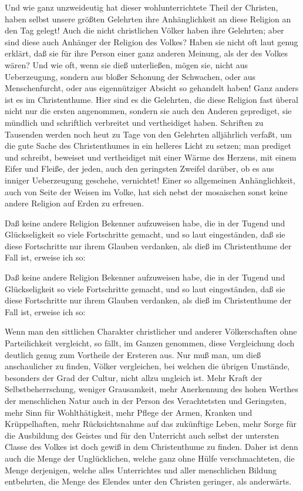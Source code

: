 \begin{aufza}
\begin{aufzb}
\item Und wie ganz unzweideutig hat dieser wohlunterrichtete Theil der Christen, haben selbst unsere größten Gelehrten ihre Anhänglichkeit an diese Religion an den Tag gelegt! Auch die nicht christlichen Völker haben ihre Gelehrten; aber sind diese auch Anhänger der Religion des Volkes? Haben sie nicht oft laut genug erklärt, daß sie für ihre Person einer ganz anderen Meinung, als der des Volkes wären? Und wie oft, wenn sie dieß unterließen, mögen sie, nicht aus Ueberzeugung, sondern aus bloßer Schonung der Schwachen, oder aus Menschenfurcht, oder aus eigennütziger Absicht so gehandelt haben! Ganz anders ist es im Christenthume. Hier sind es die Gelehrten, die diese Religion fast überal nicht nur die ersten angenommen, sondern sie auch den Anderen geprediget, sie mündlich und schriftlich verbreitet und vertheidiget haben. Schriften zu Tausenden werden noch heut zu Tage von den Gelehrten alljährlich verfaßt, um die gute Sache des Christenthumes in ein helleres Licht zu setzen; man prediget und schreibt, beweiset und vertheidiget mit einer Wärme des Herzens, mit einem Eifer und Fleiße, der jeden, auch den geringsten Zweifel darüber, ob es aus inniger Ueberzeugung geschehe, vernichtet! Einer so allgemeinen Anhänglichkeit, auch von Seite der Weisen im Volke, hat sich nebst der mosaischen sonst keine andere Religion auf Erden zu erfreuen.~
\end{aufzb}
\item Daß keine andere Religion Bekenner aufzuweisen habe, die in der Tugend und Glückseligkeit so viele Fortschritte gemacht, und so laut eingeständen, daß sie diese Fortschritte nur ihrem Glauben verdanken, als dieß im Christenthume der Fall ist, erweise ich so:
\item Daß keine andere Religion Bekenner aufzuweisen habe, die in der Tugend und Glückseligkeit so viele Fortschritte gemacht, und so laut eingeständen, daß sie diese Fortschritte nur ihrem Glauben verdanken, als dieß im Christenthume der Fall ist, erweise ich so:
\begin{aufzb}
\item Wenn man den sittlichen Charakter christlicher und anderer Völkerschaften ohne Parteilichkeit vergleicht, so fällt, im Ganzen genommen, diese Vergleichung doch deutlich genug zum Vortheile der Ersteren aus. Nur muß man, um dieß anschaulicher zu finden, Völker vergleichen, bei welchen die übrigen Umstände, besonders der Grad der Cultur, nicht allzu ungleich ist. Mehr Kraft der Selbstbeherrschung, weniger Grausamkeit, mehr Anerkennung des hohen Werthes der menschlichen Natur auch in der Person des Verachtetsten und Geringsten, mehr Sinn für Wohlthätigkeit, mehr Pflege der Armen, Kranken und Krüppelhaften, mehr Rücksichtsnahme auf das zukünftige Leben, mehr Sorge für die Ausbildung des Geistes und für den Unterricht auch selbst der untersten Classe des Volkes ist doch gewiß in dem Christenthume zu finden. Daher ist denn auch die Menge der Unglücklichen, welche ganz ohne Hülfe verschmachteten, die Menge derjenigen, welche alles Unterrichtes und aller menschlichen Bildung entbehrten, die Menge des Elendes unter den Christen geringer, als anderwärts.

\end{aufzb}
\end{aufza}
